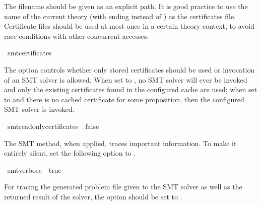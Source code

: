 \begin{isabellebody}
\begin{isamarkuptext}
The filename should be given as an explicit path. It is good
practice to use the name of the current theory (with ending
 instead of ) as the certificates file.
Certificate files should be used at most once in a certain theory context,
to avoid race conditions with other concurrent accesses.%
\end{isamarkuptext}\isamarkuptrue%
\isamarkupfalse%
\ {\isacharbrackleft}{\kern0pt}{\isacharbrackleft}{\kern0pt}smt{\isacharunderscore}{\kern0pt}certificates\ {\isacharequal}{\kern0pt}\ {\isachardoublequoteopen}{\isachardoublequoteclose}{\isacharbrackright}{\kern0pt}{\isacharbrackright}{\kern0pt}%
\begin{isamarkuptext}%
The option  controls whether only
stored certificates should be used or invocation of an SMT solver
is allowed. When set to , no SMT solver will ever be
invoked and only the existing certificates found in the configured
cache are used;  when set to  and there is no cached
certificate for some proposition, then the configured SMT solver is
invoked.%
\end{isamarkuptext}\isamarkuptrue%
\isamarkupfalse%
\ {\isacharbrackleft}{\kern0pt}{\isacharbrackleft}{\kern0pt}smt{\isacharunderscore}{\kern0pt}read{\isacharunderscore}{\kern0pt}only{\isacharunderscore}{\kern0pt}certificates\ {\isacharequal}{\kern0pt}\ false{\isacharbrackright}{\kern0pt}{\isacharbrackright}{\kern0pt}%
\isadelimdocument
%
\endisadelimdocument
%
\isatagdocument
%
\isamarkuptrue%
%
\endisatagdocument
{\isafolddocument}%
%
\isadelimdocument
%
\endisadelimdocument
%
\begin{isamarkuptext}%
The SMT method, when applied, traces important information. To
make it entirely silent, set the following option to .%
\end{isamarkuptext}\isamarkuptrue%
\isamarkupfalse%
\ {\isacharbrackleft}{\kern0pt}{\isacharbrackleft}{\kern0pt}smt{\isacharunderscore}{\kern0pt}verbose\ {\isacharequal}{\kern0pt}\ true{\isacharbrackright}{\kern0pt}{\isacharbrackright}{\kern0pt}%
\begin{isamarkuptext}%
For tracing the generated problem file given to the SMT solver as
well as the returned result of the solver, the option
 should be set to .%

\end{isamarkuptext}
\end{isabellebody}
